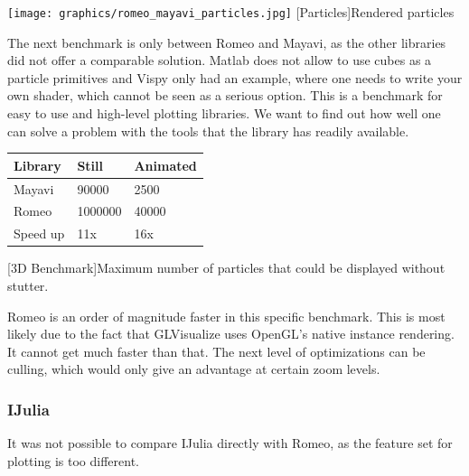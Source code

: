 \begin{minipage}{\linewidth}
    \centering
    \texttt{[image: graphics/romeo\_mayavi\_particles.jpg]}
    [Particles]{Rendered particles}
    \label{fig:reactive1}
\end{minipage}

The next benchmark is only between Romeo and Mayavi, as the other libraries did not offer a comparable solution. Matlab does not allow to use cubes as a particle primitives and Vispy only had an example, where one needs to write your own shader, which cannot be seen as a serious option. This is a benchmark for easy to use and high-level plotting libraries. We want to find out how well one can solve a problem with the tools that the library has readily available.

\begin{table}[htbp]
    \centering
    \begin{tabular}{l|l|l}
        \hline
        \textbf{Library} & \textbf{Still}  & \textbf{Animated}  \\ 
        \hline
        Mayavi           & 90000           & 2500  \\
        Romeo            & 1000000         & 40000 \\
        \hline
        \hline
        Speed up         & 11x             & 16x \\
    \end{tabular}
    [3D Benchmark]{Maximum number of particles that could be displayed without stutter.}
    \label{table:relativespeedoglw}
\end{table}

Romeo is an order of magnitude faster in this specific benchmark. This is most likely due to the fact that GLVisualize uses OpenGL's native instance rendering.
It cannot get much faster than that. The next level of optimizations can be culling, which would only give an advantage at certain zoom levels.

\subsubsection{IJulia}

It was not possible to compare IJulia directly with Romeo, as the feature set for plotting is too different.

